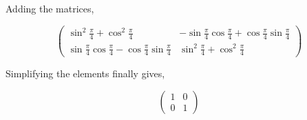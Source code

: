 \documentclass[journal,12pt,twocolumn]{IEEEtran}
\newcommand{\myvec}[1]{\ensuremath{\begin{pmatrix}#1\end{pmatrix}}}
\begin{document}
Adding the matrices,

\begin{equation}
	\myvec{\sin^2 \tfrac{\pi}{4} + \cos^2 \tfrac{\pi}{4} &  -\sin \tfrac{\pi}{4} \cos \tfrac{\pi}{4} +\cos \tfrac{\pi}{4} \sin \tfrac{\pi}{4} \\[1ex] \sin \tfrac{\pi}{4} \cos \tfrac{\pi}{4} -\cos \tfrac{\pi}{4} \sin \tfrac{\pi}{4} & \sin^2 \tfrac{\pi}{4} + \cos^2 \tfrac{\pi}{4}}
\end{equation}

Simplifying the elements finally gives,

\begin{equation}
	\myvec{1 & 0 \\ 0 & 1}
\end{equation}\\
\end{document}
